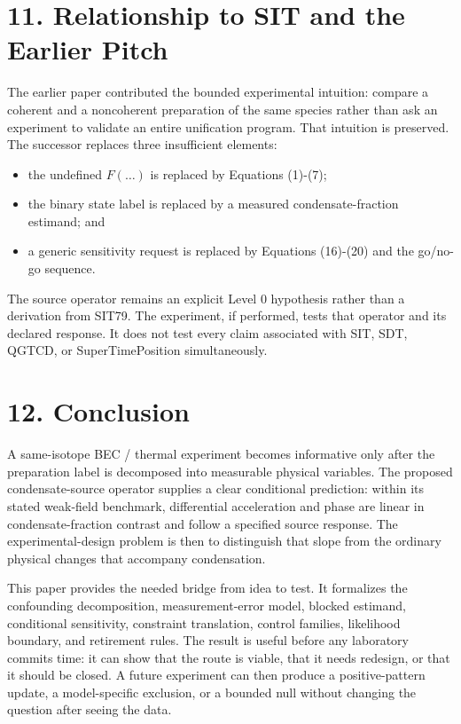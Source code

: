 \documentclass[
  american,
  11pt,
  letterpaper,
]{article}
\providecommand{\tightlist}{%
  \setlength{\itemsep}{0pt}\setlength{\parskip}{0pt}}
\begin{document}
\section{11. Relationship to SIT and the Earlier Pitch}\label{relationship-to-sit-and-the-earlier-pitch}

The earlier paper contributed the bounded experimental intuition: compare a coherent and a noncoherent preparation of the same species rather than ask an experiment to validate an entire unification program. That intuition is preserved. The successor replaces three insufficient elements:

\begin{itemize}
\tightlist
\item
  the undefined \(F(\ldots)\) is replaced by Equations (1)-(7);
\item
  the binary state label is replaced by a measured condensate-fraction estimand; and
\item
  a generic sensitivity request is replaced by Equations (16)-(20) and the go/no-go sequence.
\end{itemize}

The source operator remains an explicit Level 0 hypothesis rather than a derivation from SIT79. The experiment, if performed, tests that operator and its declared response. It does not test every claim associated with SIT, SDT, QGTCD, or SuperTimePosition simultaneously.

\section{12. Conclusion}\label{conclusion}

A same-isotope BEC / thermal experiment becomes informative only after the preparation label is decomposed into measurable physical variables. The proposed condensate-source operator supplies a clear conditional prediction: within its stated weak-field benchmark, differential acceleration and phase are linear in condensate-fraction contrast and follow a specified source response. The experimental-design problem is then to distinguish that slope from the ordinary physical changes that accompany condensation.

This paper provides the needed bridge from idea to test. It formalizes the confounding decomposition, measurement-error model, blocked estimand, conditional sensitivity, constraint translation, control families, likelihood boundary, and retirement rules. The result is useful before any laboratory commits time: it can show that the route is viable, that it needs redesign, or that it should be closed. A future experiment can then produce a positive-pattern update, a model-specific exclusion, or a bounded null without changing the question after seeing the data.
\end{document}
